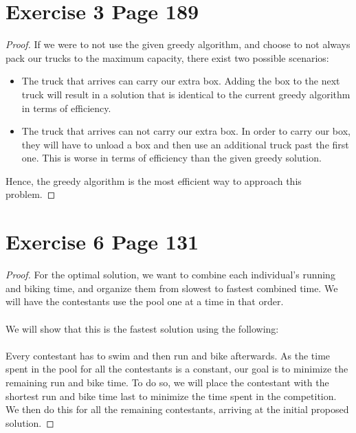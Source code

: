 \documentclass[11pt]{article}
\begin{document}
\section*{Exercise 3 Page 189}
\begin{proof}
If we were to not use the given greedy algorithm, and choose to not always pack our trucks to the maximum capacity, there exist two possible scenarios:
\begin{itemize}
\item The truck that arrives can carry our extra box. Adding the box to the next truck will result in a solution that is identical to the current greedy algorithm in terms of efficiency.
\item The truck that arrives can not carry our extra box. In order to carry our box, they will have to unload a box and then use an additional truck past the first one. This is worse in terms of efficiency than the given greedy solution.
\end{itemize}
Hence, the greedy algorithm is the most efficient way to approach this problem.
\end{proof}

\section*{Exercise 6 Page 131}
\begin{proof}
For the optimal solution, we want to combine each individual's running and biking time, and organize them from slowest to fastest combined time. We will have the contestants use the pool one at a time in that order. \\ \\
We will show that this is the fastest solution using the following: \\ \\
Every contestant has to swim and then run and bike afterwards. As the time spent in the pool for all the contestants is a constant, our goal is to minimize the remaining run and bike time. To do so, we will place the contestant with the shortest run and bike time last to minimize the time spent in the competition. We then do this for all the remaining contestants, arriving at the initial proposed solution.
\end{proof}
\newpage
\end{document}
